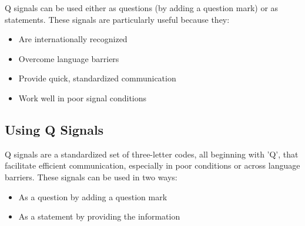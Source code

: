 Q signals can be used either as questions (by adding a question mark) or as statements. These signals are particularly useful because they:
\begin{itemize}
    \item Are internationally recognized
    \item Overcome language barriers
    \item Provide quick, standardized communication
    \item Work well in poor signal conditions
\end{itemize}

\subsection*{Using Q Signals}
Q signals are a standardized set of three-letter codes, all beginning with 'Q', that facilitate efficient communication, especially in poor conditions or across language barriers. These signals can be used in two ways:

\begin{itemize}
    \item As a question by adding a question mark
    \item As a statement by providing the information
\end{itemize}

